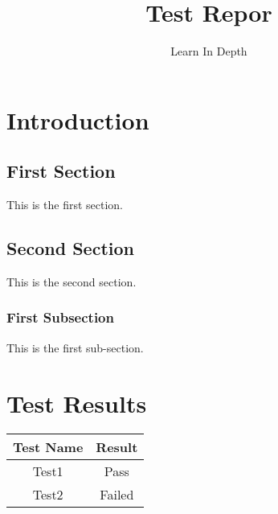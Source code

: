 \documentclass[12pt, letterpaper]{article}
\title{Test Repor}
\author{Learn In Depth}
\date{\date}
\begin{document}
\chapter{Introduction}

\section{First Section}

This is the first section.

\section{Second Section}

This is the second section.

\subsection{First Subsection}

This is the first sub-section.

\chapter{Test Results}

\begin{center}
    \begin{tabular}{||c | c ||}  \hline
        Test Name & Result \\ \hline\hline
        Test1 & Pass \\  \hline
        Test2 & Failed \\ \hline
   \end{tabular}
\end{center}
\end{document}
